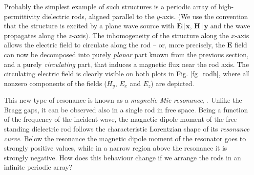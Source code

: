 \documentclass[letterpaper,12pt]{report}
\begin{document}
Probably the simplest example of such structures is a periodic array of high-permittivity dielectric rods, aligned parallel to the $y$-axis. (We use the convention that the structure is excited by a plane wave source with $\mathbf E || \mathbf x$, $\mathbf H || \mathbf y$ and the wave propagates along the $z$-axis). %
The inhomogeneity of the structure along the $x$-axis allows the electric field to circulate along the rod -- or, more precisely, the $\mathbf E$ field can now be decomposed into purely \textit{planar} part known from the previous section, and a purely \textit{circulating} part, that induces a magnetic flux near the rod axis. The circulating electric field is clearly visible on both plots in Fig. \ref{fg_rodh}, where all nonzero components of the fields ($H_y$, $E_x$ and $E_z$) are depicted. 

This new type of resonance is known as a \textit{magnetic Mie resonance}, \cite{obrien2002photonic, nemec2009tunable, yahiaoui2009broadband, yahiaoui2011tunable}. Unlike the Bragg gaps, it can be observed also in a single rod in free space. Being a function of the frequency of the incident wave, the magnetic dipole moment of the free-standing dielectric rod follows the characteristic Lorentzian shape of its \textit{resonance curve}. Below the resonance the magnetic dipole moment of the resonator goes to strongly positive values, while in a narrow region above the resonance it is strongly negative. How does this behaviour change if we arrange the rods in an infinite periodic array? 
\end{document}
